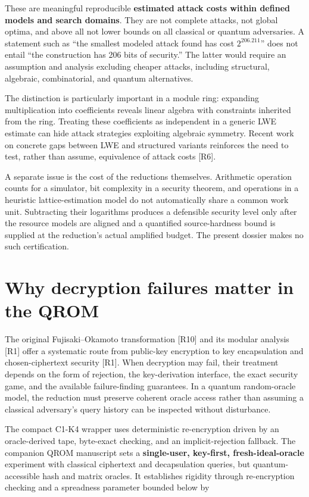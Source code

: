 \documentclass[
  11pt,
  a4paper,
  oneside]{report}
\begin{document}
These are meaningful reproducible \textbf{estimated attack costs within
defined models and search domains}. They are not complete attacks, not
global optima, and above all not lower bounds on all classical or
quantum adversaries. A statement such as ``the smallest modeled attack
found has cost \(2^{206.211}\)'' does not entail ``the construction has
206 bits of security.'' The latter would require an assumption and
analysis excluding cheaper attacks, including structural, algebraic,
combinatorial, and quantum alternatives.

The distinction is particularly important in a module ring: expanding
multiplication into coefficients reveals linear algebra with constraints
inherited from the ring. Treating these coefficients as independent in a
generic LWE estimate can hide attack strategies exploiting algebraic
symmetry. Recent work on concrete gaps between LWE and structured
variants reinforces the need to test, rather than assume, equivalence of
attack costs {[}R6{]}.

A separate issue is the cost of the reductions themselves. Arithmetic
operation counts for a simulator, bit complexity in a security theorem,
and operations in a heuristic lattice-estimation model do not
automatically share a common work unit. Subtracting their logarithms
produces a defensible security level only after the resource models are
aligned and a quantified source-hardness bound is supplied at the
reduction's actual amplified budget. The present dossier makes no such
certification.

\section{Why decryption failures matter in the
QROM}\label{why-decryption-failures-matter-in-the-qrom}

The original Fujisaki--Okamoto transformation {[}R10{]} and its modular
analysis {[}R1{]} offer a systematic route from public-key encryption to
key encapsulation and chosen-ciphertext security {[}R1{]}. When
decryption may fail, their treatment depends on the form of rejection,
the key-derivation interface, the exact security game, and the available
failure-finding guarantees. In a quantum random-oracle model, the
reduction must preserve coherent oracle access rather than assuming a
classical adversary's query history can be inspected without
disturbance.

The compact C1-K4 wrapper uses deterministic re-encryption driven by an
oracle-derived tape, byte-exact checking, and an implicit-rejection
fallback. The companion QROM manuscript sets a \textbf{single-user,
key-first, fresh-ideal-oracle} experiment with classical ciphertext and
decapsulation queries, but quantum-accessible hash and matrix oracles.
It establishes rigidity through re-encryption checking and a spreadness
parameter bounded below by
\end{document}
